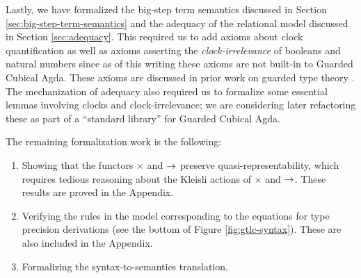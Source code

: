 


Lastly, we have formalized the big-step term semantics discussed in Section
\ref{sec:big-step-term-semantics} and the adequacy of the relational model
discussed in Section \ref{sec:adequacy}. This required us to add axioms about
clock quantification as well as axioms asserting the \emph{clock-irrelevance} of
booleans and natural numbers since as of this writing these axioms are not
built-in to Guarded Cubical Agda. These axioms are discussed in prior work on
guarded type theory \cite{atkey-mcbride2013, kristensen-mogelberg-vezzosi2022}.
The mechanization of adequacy also required us to formalize some essential
lemmas involving clocks and clock-irrelevance; we are considering later
refactoring these as part of a ``standard library'' for Guarded Cubical
Agda.

The remaining formalization work is the following:
\begin{enumerate}
    \item Showing that the functors $\times$ and $\to$ preserve
    quasi-representability, which requires tedious reasoning about the Kleisli actions of
    $\times$ and $\to$. These results are proved in the Appendix.
    \item Verifying the rules in the model corresponding to the equations for
    type precision derivations (see the bottom of Figure \ref{fig:gtlc-syntax}).
    These are also included in the Appendix.
    \item Formalizing the syntax-to-semantics translation.
\end{enumerate} 

